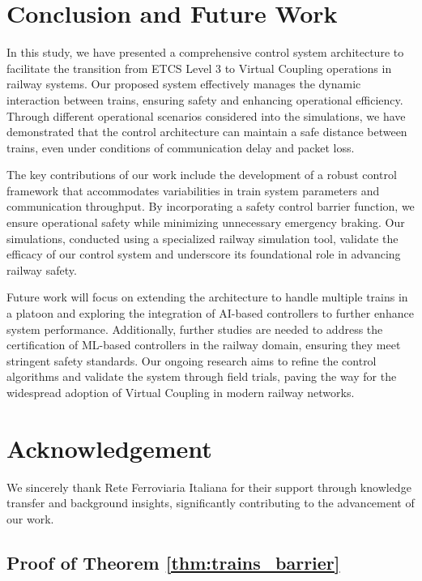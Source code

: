 \documentclass[letterpaper, 10 pt, conference]{ieeeconf}
\theoremstyle{definition}
\theoremstyle{nopoint}
\newcounter{Theorem}
\begin{document}
\section{Conclusion and Future Work}
\label{sec:conclusion}

In this study, we have presented a comprehensive control system architecture to facilitate the transition from ETCS Level 3 to Virtual Coupling operations in railway systems. Our proposed system effectively manages the dynamic interaction between trains, ensuring safety and enhancing operational efficiency. Through different operational scenarios considered into the simulations, we have demonstrated that the control architecture can maintain a safe distance between trains, even under conditions of communication delay and packet loss. 

The key contributions of our work include the development of a robust control framework that accommodates variabilities in train system parameters and communication throughput. By incorporating a safety control barrier function, we ensure operational safety while minimizing unnecessary emergency braking. Our simulations, conducted using a specialized railway simulation tool, validate the efficacy of our control system and underscore its foundational role in advancing railway safety.

Future work will focus on extending the architecture to handle multiple trains in a platoon and exploring the integration of AI-based controllers to further enhance system performance. Additionally, further studies are needed to address the certification of ML-based controllers in the railway domain, ensuring they meet stringent safety standards. Our ongoing research aims to refine the control algorithms and validate the system through field trials, paving the way for the widespread adoption of Virtual Coupling in modern railway networks.


\section*{Acknowledgement}
We sincerely thank Rete Ferroviaria Italiana for their support through knowledge transfer and background insights, significantly contributing to the advancement of our work.

\appendix

\subsection{Proof of Theorem \ref{thm:trains_barrier}}
\label{appendix:proofTheorem}
\end{document}
